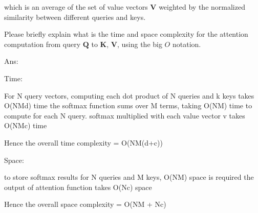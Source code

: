 \documentclass[10pt]{article}
\begin{document}
which is an average of the set of value vectors $\mathbf{V}$ weighted by the normalized similarity between different queries and keys.

Please briefly explain what is the time and space complexity for the attention computation from query $\mathbf{Q}$ to $\mathbf{K}$, $\mathbf{V}$, using the big $O$ notation.

Ans: 

Time:

For N query vectors, 
computing each dot product of N queries and k keys takes O(NMd) time
the softmax function sums over M terms, taking O(NM) time to compute for each N query.
softmax multiplied with each value vector v takes O(NMc) time

Hence the overall time complexity = O(NM(d+c))

Space:

to store softmax results for N queries and M keys, O(NM) space is required
the output of attention function takes O(Nc) space

Hence the overall space complexity = O(NM + Nc)
\end{document}
